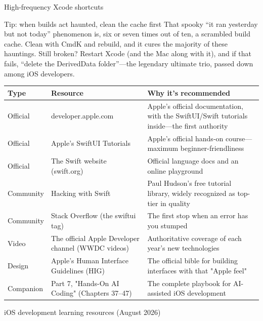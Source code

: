 \begin{center}\small\color{gray}High-frequency Xcode shortcuts\end{center}

\begin{tcbinfo}{Tip: when builds act haunted, clean the cache first}
That spooky “it ran yesterday but not today” phenomenon is, six or seven times out of ten, a scrambled build cache. Clean with CmdK and rebuild, and it cures the majority of these hauntings. Still broken? Restart Xcode (and the Mac along with it), and if that fails, “delete the DerivedData folder”—the legendary ultimate trio, passed down among iOS developers.

\end{tcbinfo}



\begin{center}
\begin{tabularx}{\linewidth}{|X|X|X|}
\hline
\textbf{Type} & \textbf{Resource} & \textbf{Why it's recommended} \tabularnewline
\hline
Official & developer.apple.com & Apple's official documentation, with the SwiftUI/Swift tutorials inside—the first authority \tabularnewline
Official & Apple's SwiftUI Tutorials & Apple's official hands-on course—maximum beginner-friendliness \tabularnewline
Official & The Swift website (swift.org) & Official language docs and an online playground \tabularnewline
Community & Hacking with Swift & Paul Hudson's free tutorial library, widely recognized as top-tier in quality \tabularnewline
Community & Stack Overflow (the swiftui tag) & The first stop when an error has you stumped \tabularnewline
Video & The official Apple Developer channel (WWDC videos) & Authoritative coverage of each year's new technologies \tabularnewline
Design & Apple's Human Interface Guidelines (HIG) & The official bible for building interfaces with that "Apple feel" \tabularnewline
Companion & Part 7, "Hands-On AI Coding" (Chapters 37–47) & The complete playbook for AI-assisted iOS development \tabularnewline
\hline
\end{tabularx}
\end{center}

\begin{center}\small\color{gray}iOS development learning resources (August 2026)\end{center}



